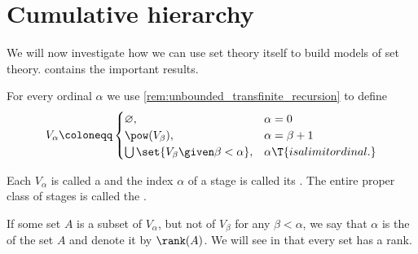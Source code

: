 \section{Cumulative hierarchy}\label{sec:cumulative_hierarchy}

We will now investigate how we can use set theory itself to build models of set theory.  contains the important results.

\begin{definition}\label{def:cumulative_hierarchy}
  For every ordinal \( \alpha \) we use \cref{rem:unbounded_transfinite_recursion} to define
  \begin{equation}\label{eq:def:cumulative_hierarchy}
    V_\alpha \coloneqq \begin{cases}
      \varnothing,                                  &\alpha = 0 \\
      \pow(V_\beta),                                &\alpha = \beta + 1 \\
      \bigcup\set{ V_\beta \given \beta < \alpha }, &\alpha \T{is a limit ordinal.}
    \end{cases}
  \end{equation}

  Each \( V_\alpha \) is called a  and the index \( \alpha \) of a stage is called its . The entire proper class of stages is called the .

  If some set \( A \) is a subset of \( V_\alpha \), but not of \( V_\beta \) for any \( \beta < \alpha \), we say that \( \alpha \) is the  of the set \( A \) and denote it by \( \rank(A) \). We will see in  that every set has a rank.
\end{definition}

